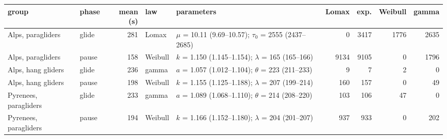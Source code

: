 \begin{tabular}{llrllrrrr}
\toprule
group & phase & mean (s) & law & parameters & Lomax & exp. & Weibull & gamma \\
\midrule
Alps, paragliders & glide & 281 & Lomax & $\mu$ = 10.11 (9.69--10.57); $\tau_0$ = 2555 (2437--2685) & 0 & 3417 & 1776 & 2635 \\
Alps, paragliders & pause & 158 & Weibull & $k$ = 1.150 (1.145--1.154); $\lambda$ = 165 (165--166) & 9134 & 9105 & 0 & 1796 \\
Alps, hang gliders & glide & 236 & gamma & $a$ = 1.057 (1.012--1.104); $\theta$ = 223 (211--233) & 9 & 7 & 2 & 0 \\
Alps, hang gliders & pause & 198 & Weibull & $k$ = 1.155 (1.125--1.188); $\lambda$ = 207 (199--214) & 160 & 157 & 0 & 49 \\
Pyrenees, paragliders & glide & 233 & gamma & $a$ = 1.089 (1.068--1.110); $\theta$ = 214 (208--220) & 103 & 106 & 47 & 0 \\
Pyrenees, paragliders & pause & 194 & Weibull & $k$ = 1.166 (1.152--1.180); $\lambda$ = 204 (201--207) & 937 & 933 & 0 & 202 \\
\bottomrule
\end{tabular}

